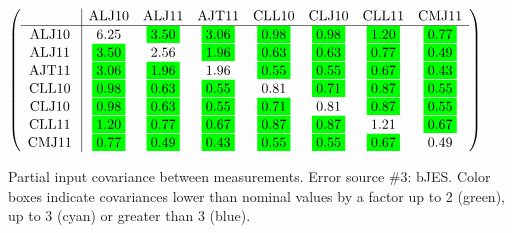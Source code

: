 \begin{table}[H]
\scriptsize
\begin{center}
\renewcommand{\arraystretch}{1.1}
\begin{math}\left(\begin{array}{c|ccccccc}
 & \mathrm{ALJ10} & 
\mathrm{ALJ11} & 
\mathrm{AJT11} & 
\mathrm{CLL10} & 
\mathrm{CLJ10} & 
\mathrm{CLL11} & 
\mathrm{CMJ11} \\
\hline
\mathrm{ALJ10} \hspace*{2pt} &       6.25 &  \colorbox{Green1}{$      3.50$} &  \colorbox{Green1}{$      3.06$} &  \colorbox{Green1}{$      0.98$} &  \colorbox{Green1}{$      0.98$} &  \colorbox{Green1}{$      1.20$} &  \colorbox{Green1}{$      0.77$} \\
\mathrm{ALJ11} \hspace*{2pt} &  \colorbox{Green1}{$      3.50$} &       2.56 &  \colorbox{Green1}{$      1.96$} &  \colorbox{Green1}{$      0.63$} &  \colorbox{Green1}{$      0.63$} &  \colorbox{Green1}{$      0.77$} &  \colorbox{Green1}{$      0.49$} \\
\mathrm{AJT11} \hspace*{2pt} &  \colorbox{Green1}{$      3.06$} &  \colorbox{Green1}{$      1.96$} &       1.96 &  \colorbox{Green1}{$      0.55$} &  \colorbox{Green1}{$      0.55$} &  \colorbox{Green1}{$      0.67$} &  \colorbox{Green1}{$      0.43$} \\
\mathrm{CLL10} \hspace*{2pt} &  \colorbox{Green1}{$      0.98$} &  \colorbox{Green1}{$      0.63$} &  \colorbox{Green1}{$      0.55$} &       0.81 &  \colorbox{Green1}{$      0.71$} &  \colorbox{Green1}{$      0.87$} &  \colorbox{Green1}{$      0.55$} \\
\mathrm{CLJ10} \hspace*{2pt} &  \colorbox{Green1}{$      0.98$} &  \colorbox{Green1}{$      0.63$} &  \colorbox{Green1}{$      0.55$} &  \colorbox{Green1}{$      0.71$} &       0.81 &  \colorbox{Green1}{$      0.87$} &  \colorbox{Green1}{$      0.55$} \\
\mathrm{CLL11} \hspace*{2pt} &  \colorbox{Green1}{$      1.20$} &  \colorbox{Green1}{$      0.77$} &  \colorbox{Green1}{$      0.67$} &  \colorbox{Green1}{$      0.87$} &  \colorbox{Green1}{$      0.87$} &       1.21 &  \colorbox{Green1}{$      0.67$} \\
\mathrm{CMJ11} \hspace*{2pt} &  \colorbox{Green1}{$      0.77$} &  \colorbox{Green1}{$      0.49$} &  \colorbox{Green1}{$      0.43$} &  \colorbox{Green1}{$      0.55$} &  \colorbox{Green1}{$      0.55$} &  \colorbox{Green1}{$      0.67$} &       0.49 \\
\end{array}\right)\end{math}
\caption{Partial input covariance between measurements. Error source \#3: bJES. Color boxes indicate covariances lower than nominal values by a factor up to 2 (green), up to 3 (cyan) or greater than 3 (blue).}
\renewcommand{\arraystretch}{1}
\end{center}
\end{table}
